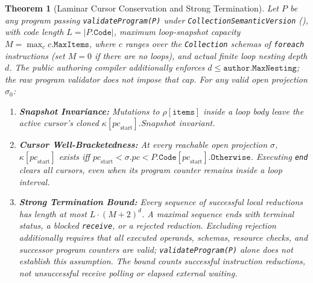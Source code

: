 \documentclass[11pt,a4paper]{article}
\newtheorem{theorem}{Theorem}[section]
\theoremstyle{definition}
\theoremstyle{remark}
\begin{document}
\begin{theorem}[Laminar Cursor Conservation and Strong Termination]
\label{thm:loops}
Let $P$ be any program passing \texttt{validateProgram(P)} under \allowbreak\texttt{CollectionSemanticVersion} (), with code length $L = |P.\mathtt{Code}|$, maximum loop-snapshot capacity $M = \max_c c.\mathtt{MaxItems}$, where $c$ ranges over the \texttt{Collection} schemas of \texttt{foreach} instructions (set $M=0$ if there are no loops), and actual finite loop nesting depth $d$. The public authoring compiler additionally enforces $d \le \mathtt{author.MaxNesting}$; the raw program validator does not impose that cap. For any valid open projection $\sigma_0$:
\begin{enumerate}
  \item \textbf{Snapshot Invariance:} Mutations to $\rho[\mathtt{items}]$ inside a loop body leave the active cursor's cloned $\kappa[\mathit{pc}_{\text{start}}].\mathit{Snapshot}$ invariant.
  \item \textbf{Cursor Well-Bracketedness:} At every reachable open projection $\sigma$, $\kappa[\mathit{pc}_{\text{start}}]$ exists iff $\mathit{pc}_{\text{start}} < \sigma.\mathit{pc} < \allowbreak P.\mathtt{Code}[\mathit{pc}_{\text{start}}].\mathtt{Otherwise}$. Executing \texttt{end} clears all cursors, even when its program counter remains inside a loop interval.
  \item \textbf{Strong Termination Bound:} Every sequence of successful local reductions has length at most $L \cdot (M+2)^d$. A maximal sequence ends with terminal status, a blocked \texttt{receive}, or a rejected reduction. Excluding rejection additionally requires that all executed operands, schemas, resource checks, and successor program counters are valid; \texttt{validateProgram(P)} alone does not establish this assumption. The bound counts successful instruction reductions, not unsuccessful receive polling or elapsed external waiting.
\end{enumerate}
\end{theorem}
\end{document}
